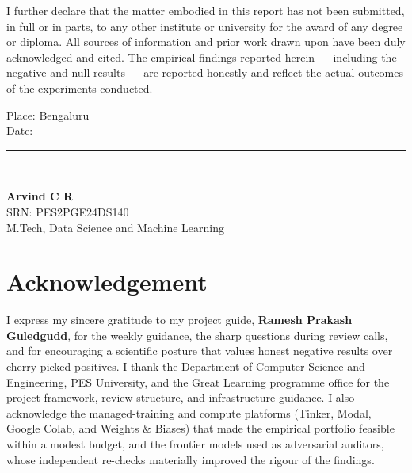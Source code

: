 \documentclass[12pt,a4paper]{report}
\begin{document}
\vspace{0.6em}

I further declare that the matter embodied in this report has not been submitted,
in full or in parts, to any other institute or university for the award of any
degree or diploma. All sources of information and prior work drawn upon have been
duly acknowledged and cited. The empirical findings reported herein --- including
the negative and null results --- are reported honestly and reflect the actual
outcomes of the experiments conducted.

\vspace{3.2em}

\noindent
\begin{minipage}[t]{0.5\linewidth}
Place: Bengaluru\\[0.4em]
Date: \rule{3cm}{0.4pt}
\end{minipage}
\hfill
\begin{minipage}[t]{0.45\linewidth}
\centering
\vspace{1.2em}
\rule{5cm}{0.4pt}\\
\textbf{Arvind C R}\\
SRN: PES2PGE24DS140\\
M.Tech, Data Science and Machine Learning
\end{minipage}

\clearpage
{}
\setcounter{page}{1}

\chapter*{Acknowledgement}
I express my sincere gratitude to my project guide, \textbf{Ramesh Prakash
Guledgudd}, for the weekly guidance, the sharp questions during review calls, and
for encouraging a scientific posture that values honest negative results over
cherry-picked positives. I thank the Department of Computer Science and
Engineering, PES University, and the Great Learning programme office for the
project framework, review structure, and infrastructure guidance. I also
acknowledge the managed-training and compute platforms (Tinker, Modal, Google
Colab, and Weights \& Biases) that made the empirical portfolio feasible within a
modest budget, and the frontier models used as adversarial auditors, whose
independent re-checks materially improved the rigour of the findings.
\end{document}
